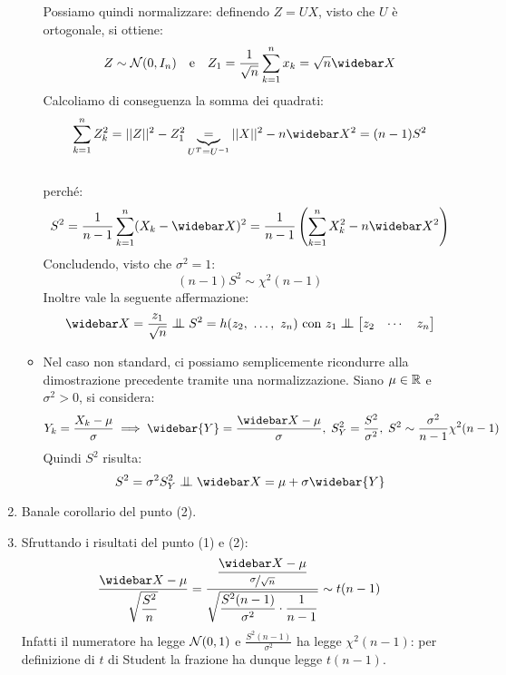 \begin{dimo}
\begin{enumerate}
\begin{itemize}
      Possiamo quindi normalizzare: definendo $Z=UX$, visto che $U$ è ortogonale, si ottiene:
      $$Z \sim \Nc(0, I_n) \quad \text{e} \quad Z_1= \frac{1}{\sqrt{n}} \sum\limits_{k=1}^{n}x_k=\sqrt{n}\widebar X$$
      Calcoliamo di conseguenza la somma dei quadrati:
      $$\sum_{k=1}^{n}Z_k^2=||Z||^2-Z_1^2 \underbrace{=}_{U^T=U^{-1}} ||X||^2-n\widebar X^2=(n-1)S^2$$ \\
      perché:
      $$S^2= \frac{1}{n-1} \sum_{k=1}^{n}(X_k-\widebar X)^2= \frac{1}{n-1} \left(\sum\limits_{k=1}^{n}X_k^2-n\widebar X^2\right)$$
      Concludendo, visto che $\sigma^2 = 1$:
      $$(n-1)S^2 \sim \chi^2(n-1)$$
      Inoltre vale la seguente affermazione:
      $$\widebar X=\frac{z_1}{\sqrt{n}} \indep S^2=h(z_2,\ \dots,\ z_n) \text{ con } z_1 \indep \begin{bmatrix} z_2 & \cdots & z_n \end{bmatrix}$$
    \item Nel caso non standard, ci possiamo semplicemente ricondurre alla dimostrazione precedente tramite una normalizzazione. Siano $\mu \in \mathbb R $ e $ \sigma^2>0$, si considera:
      $$Y_k=\frac{X_k-\mu}{\sigma} \implies \widebar{Y}=\frac{\widebar X-\mu}{\sigma}, \; S_Y^2=\frac{S^2}{\sigma^2}, \; S^2 \sim \frac{\sigma^2}{n-1} \chi^2(n-1)$$
      Quindi $S^2$ risulta:
      $$S^2=\sigma^2 S_Y^2 \indep \widebar X=\mu + \sigma \widebar{Y}$$
      \end{itemize}
  \item Banale corollario del punto (2).
  \item Sfruttando i risultati del punto (1) e (2):
    $$\dfrac{\widebar X-\mu}{\sqrt{\dfrac{S^2}{n}}} = \dfrac{
    \dfrac{\widebar X-\mu}{\nicefrac{\sigma}{\sqrt n}}}
      {\sqrt{
        \dfrac{S^2(n-1)}{\sigma^2} \cdot \dfrac 1 {n-1}
      }} \sim t(n-1)$$
    Infatti il numeratore ha legge $\mathcal N(0,1)$ e $\frac{S^2(n-1)}{\sigma^2}$ ha legge $\chi^2(n-1)$: per definizione di $t$ di Student la frazione ha dunque legge $t(n-1)$. \qedhere
  \end{enumerate}
\end{dimo}

